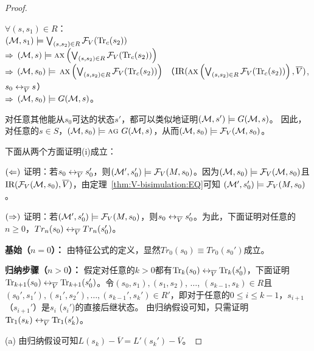 \begin{proof}
\begin{itemize}
		$\forall (s, s_1) \in R$：\\
		$({\cal M}, s_1) \models \bigvee_{(s, s_2)\in R}{\cal F}_V(\textrm{Tr}_c(s_2))$\\
		$\Rightarrow$ $({\cal M}, s) \models \textsc{a} \textsc{x} \left( \bigvee_{(s, s_2)\in R} {\cal F}_V(\textrm{Tr}_c(s_2)) \right)$ \\
		$\Rightarrow$ $({\cal M}, s_0) \models$  $\textsc{a} \textsc{x} \left( \bigvee_{(s, s_2)\in R} {\cal F}_V(\textrm{Tr}_c(s_2)) \right)$   \hfill   （$\textrm{IR}(\textsc{a} \textsc{x} \left( \bigvee_{(s, s_2)\in R} {\cal F}_V(\textrm{Tr}_c(s_2)) \right), \overline V)$, $s_0 \leftrightarrow_{\overline V} s$）\\
		$\Rightarrow$ $({\cal M}, s_0) \models G({\cal M}, s)$。\\
	\end{itemize}
	
	对任意其他能从$s_0$可达的状态$s'$，都可以类似地证明$({\cal M},s')\models G({\cal M}, s)$。
	因此，对任意的$s\in S$，$({\cal M}, s_0) \models \textsc{a}\textsc{g}\ G({\cal M}, s)$，从而$({\cal M}, s_0) \models {\cal F}_V({\cal M}, s_0)$。
	
	下面从两个方面证明(i)成立：
	
	$(\Leftarrow)$ 证明：若$s_0 \leftrightarrow_{\overline V} s_0'$，则$({\cal M}',s_0') \models {\cal F}_V(M,s_0)$。因为$({\cal M}, s_0) \models {\cal F}_V({\cal M}, s_0)$且 $\textrm{IR}({\cal F}_V({\cal M}, s_0), \overline V)$，由定理~\ref{thm:V-bisimulation:EQ}可知
	$({\cal M}',s_0') \models {\cal F}_V(M,s_0)$。
	
	$(\Rightarrow)$ 证明：若$({\cal M}',s_0') \models {\cal F}_V(M,s_0)$，则$s_0 \leftrightarrow_{\overline V} s_0'$。为此，下面证明对任意的$n \geq 0$，$Tr_n(s_0) \leftrightarrow_{\overline V} Tr_n(s_0')$。
	
	
	\textbf{基始（$n=0$）：} 由特征公式的定义，显然$Tr_0(s_0) \equiv Tr_0(s_0')$成立。
	
	\textbf{归纳步骤（$n>0$）：} 假定对任意的$k > 0$都有$\textrm{Tr}_k(s_0) \leftrightarrow_{\overline V} \textrm{Tr}_k(s_0')$，下面证明$\textrm{Tr}_{k+1}(s_0) \leftrightarrow_{\overline V} \textrm{Tr}_{k+1}(s_0')$。令$(s_0, s_1), (s_1, s_2)$, $\dots$, $(s_{k-1}, s_k) \in R$且$(s_0', s_1'), (s_1', s_2'), \dots, (s_{k-1}', s_k') \in R'$，即对于任意的$0 \leq i \leq k-1$，$s_{i+1}$（$s_{i+1}'$）是$s_i$ ($s_i'$)的直接后继状态。
	由归纳假设可知，只需证明$\textrm{Tr}_1(s_k) \leftrightarrow_{\overline V} \textrm{Tr}_1(s_k')$。
	
	(a) 由归纳假设可知$L(s_k) - \overline V = L'(s_k') - \overline V$。
	

\end{proof}
